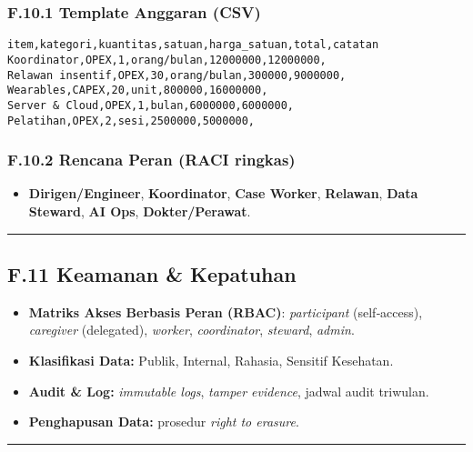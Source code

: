\documentclass[
  letterpaper,
  DIV=11,
  numbers=noendperiod]{scrartcl}
\providecommand{\tightlist}{%
  \setlength{\itemsep}{0pt}\setlength{\parskip}{0pt}}
\begin{document}
\subsubsection{F.10.1 Template Anggaran
(CSV)}\label{f.10.1-template-anggaran-csv}

\begin{verbatim}
item,kategori,kuantitas,satuan,harga_satuan,total,catatan
Koordinator,OPEX,1,orang/bulan,12000000,12000000,
Relawan insentif,OPEX,30,orang/bulan,300000,9000000,
Wearables,CAPEX,20,unit,800000,16000000,
Server & Cloud,OPEX,1,bulan,6000000,6000000,
Pelatihan,OPEX,2,sesi,2500000,5000000,
\end{verbatim}

\subsubsection{F.10.2 Rencana Peran (RACI
ringkas)}\label{f.10.2-rencana-peran-raci-ringkas}

\begin{itemize}
\tightlist
\item
  \textbf{Dirigen/Engineer}, \textbf{Koordinator}, \textbf{Case Worker},
  \textbf{Relawan}, \textbf{Data Steward}, \textbf{AI Ops},
  \textbf{Dokter/Perawat}.
\end{itemize}

\begin{center}\rule{0.5\linewidth}{0.5pt}\end{center}

\subsection{F.11 Keamanan \& Kepatuhan}\label{f.11-keamanan-kepatuhan}

\begin{itemize}
\tightlist
\item
  \textbf{Matriks Akses Berbasis Peran (RBAC)}: \emph{participant}
  (self‑access), \emph{caregiver} (delegated), \emph{worker},
  \emph{coordinator}, \emph{steward}, \emph{admin}.
\item
  \textbf{Klasifikasi Data:} Publik, Internal, Rahasia, Sensitif
  Kesehatan.
\item
  \textbf{Audit \& Log:} \emph{immutable logs}, \emph{tamper evidence},
  jadwal audit triwulan.
\item
  \textbf{Penghapusan Data:} prosedur \emph{right to erasure}.
\end{itemize}

\begin{center}\rule{0.5\linewidth}{0.5pt}\end{center}
\end{document}
